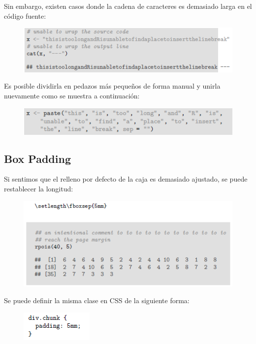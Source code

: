 \documentclass[10pt]{article}   			%
\begin{document}
Sin embargo, existen casos donde la cadena de caracteres es demasiado larga en el código fuente:

\begin{figure}[ht] 
	\centering
		\includegraphics[scale=1.1]{Width2} 
		\label{fig:Width2}
\end{figure}

Es posible dividirla en pedazos más pequeños de forma manual y unirla nuevamente como se muestra a continuación:

\begin{figure}[ht] 
	\centering
		\includegraphics[scale=1.2]{Width3} 
		\label{fig:Width3}
\end{figure}

\newpage
\subsection{Box Padding}

Si sentimos que el relleno por defecto de la caja es demasiado ajustado, se puede restablecer la longitud:

\begin{figure}[ht] 
	\centering
		\includegraphics[scale=0.8]{Padding1}
		\label{fig:Padding1}
\end{figure}

Se puede definir la misma clase en CSS de la siguiente forma:

\begin{figure}[ht] 
	\centering
		\includegraphics[scale=1.2]{Padding2} 
		\label{fig:Padding2}
\end{figure}
	
\end{document}
